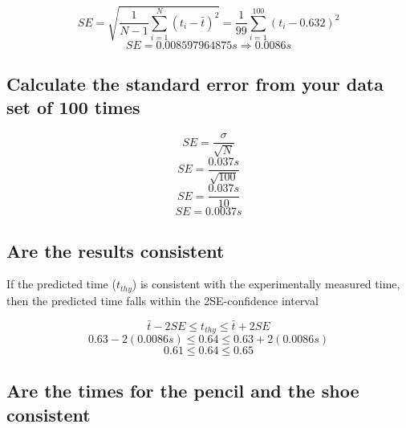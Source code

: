 \documentclass[11pt, letterpaper, includehead]{article}
\begin{document}
$$SE = \sqrt{\frac{1}{N - 1}\sum_{i = 1}^{N}(t_i-\bar{t})^2} = \frac{1}{99}\sum_{i = 1}^{100}(t_i - 0.632)^2$$
$$SE = 0.008597964875s \Rightarrow \boxed{0.0086s}$$

\subsection{Calculate the standard error from your data set of 100 times}

$$SE = \frac{\sigma}{\sqrt{N}}$$
$$SE = \frac{0.037s}{\sqrt{100}}$$
$$SE = \frac{0.037s}{10}$$
$$SE = \boxed{0.0037s}$$

\subsection{Are the results consistent}
If the predicted time ($t_{thy}$) is consistent with the experimentally 
measured time, then the predicted time falls within the 2SE-confidence interval

$$\bar{t} - 2SE \leq t_{thy} \leq \bar{t} + 2SE$$
$$0.63 - 2(0.0086s) \leq 0.64 \leq 0.63 + 2(0.0086s)$$
$$0.61 \leq 0.64 \leq 0.65$$


\subsection{Are the times for the pencil and the shoe consistent}
\end{document}

